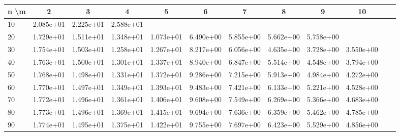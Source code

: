 \begin{table}[H]
\centering
\scriptsize
\setlength{\tabcolsep}{2pt}
\begin{tabular}{|l|ccccccccccc||}
\hline
n \textbackslash m & 2 & 3 & 4 & 5 & 6 & 7 & 8 & 9 & 10 \\\hline
10 & \cellcolor{Red!77}2.085e+01 & \cellcolor{Red!83}2.225e+01 & \cellcolor{Red!100}2.588e+01 \\
20 & \cellcolor{Red!61}1.729e+01 & \cellcolor{Red!51}1.511e+01 & \cellcolor{Red!44}1.348e+01 & \cellcolor{Red!32}1.073e+01 & \cellcolor{Red!13}6.490e+00 & \cellcolor{Red!10}5.855e+00 & \cellcolor{Red!9}5.662e+00 & \cellcolor{Red!9}5.758e+00 \\
30 & \cellcolor{Red!62}1.754e+01 & \cellcolor{Red!51}1.503e+01 & \cellcolor{Red!40}1.258e+01 & \cellcolor{Red!40}1.267e+01 & \cellcolor{Red!20}8.217e+00 & \cellcolor{Red!11}6.056e+00 & \cellcolor{Red!4}4.635e+00 & \cellcolor{Red!0}3.728e+00 & \cellcolor{Red!0}3.550e+00 \\
40 & \cellcolor{Red!63}1.763e+01 & \cellcolor{Red!51}1.500e+01 & \cellcolor{Red!42}1.301e+01 & \cellcolor{Red!43}1.337e+01 & \cellcolor{Red!24}8.940e+00 & \cellcolor{Red!14}6.847e+00 & \cellcolor{Red!8}5.514e+00 & \cellcolor{Red!4}4.548e+00 & \cellcolor{Red!1}3.794e+00 \\
50 & \cellcolor{Red!63}1.768e+01 & \cellcolor{Red!51}1.498e+01 & \cellcolor{Red!43}1.331e+01 & \cellcolor{Red!45}1.372e+01 & \cellcolor{Red!25}9.286e+00 & \cellcolor{Red!16}7.215e+00 & \cellcolor{Red!10}5.913e+00 & \cellcolor{Red!6}4.984e+00 & \cellcolor{Red!3}4.272e+00 \\
60 & \cellcolor{Red!63}1.770e+01 & \cellcolor{Red!51}1.497e+01 & \cellcolor{Red!44}1.349e+01 & \cellcolor{Red!46}1.393e+01 & \cellcolor{Red!26}9.483e+00 & \cellcolor{Red!17}7.421e+00 & \cellcolor{Red!11}6.133e+00 & \cellcolor{Red!7}5.221e+00 & \cellcolor{Red!4}4.528e+00 \\
70 & \cellcolor{Red!63}1.772e+01 & \cellcolor{Red!51}1.496e+01 & \cellcolor{Red!45}1.361e+01 & \cellcolor{Red!47}1.406e+01 & \cellcolor{Red!27}9.608e+00 & \cellcolor{Red!17}7.549e+00 & \cellcolor{Red!12}6.269e+00 & \cellcolor{Red!8}5.366e+00 & \cellcolor{Red!5}4.683e+00 \\
80 & \cellcolor{Red!63}1.773e+01 & \cellcolor{Red!51}1.496e+01 & \cellcolor{Red!45}1.369e+01 & \cellcolor{Red!47}1.415e+01 & \cellcolor{Red!27}9.694e+00 & \cellcolor{Red!18}7.636e+00 & \cellcolor{Red!12}6.359e+00 & \cellcolor{Red!8}5.462e+00 & \cellcolor{Red!5}4.785e+00 \\
90 & \cellcolor{Red!63}1.774e+01 & \cellcolor{Red!51}1.495e+01 & \cellcolor{Red!45}1.375e+01 & \cellcolor{Red!47}1.422e+01 & \cellcolor{Red!27}9.755e+00 & \cellcolor{Red!18}7.697e+00 & \cellcolor{Red!12}6.423e+00 & \cellcolor{Red!8}5.529e+00 & \cellcolor{Red!5}4.856e+00 \\

\end{tabular}
\end{table}
